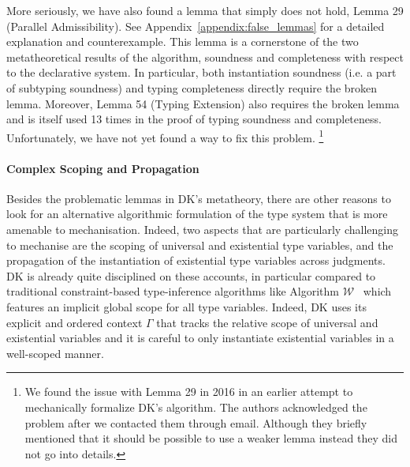 
More seriously, we have also found a lemma that simply does not hold, 
Lemma 29 (Parallel Admissibility). See Appendix~\ref{appendix:false_lemmas}
 for a detailed explanation
and counterexample. This lemma is a cornerstone of the two metatheoretical results 
of the algorithm, soundness and completeness with respect to the declarative system.
In particular, both instantiation soundness (i.e. a part of subtyping
soundness) and typing completeness directly require the broken lemma.
Moreover, Lemma 54 (Typing Extension) also requires the broken lemma and is
itself used 13 times in the proof of typing soundness and completeness.
Unfortunately, we have not yet found a way to fix this problem.
\footnote{We found the issue with Lemma 29 in 2016 in an earlier attempt to mechanically
  formalize DK's algorithm. The authors acknowledged the problem after we contacted them through email.
  Although they briefly mentioned that it should be possible to use a weaker lemma instead they did
  not go into details.
}

\paragraph{Complex Scoping and Propagation}

Besides the problematic lemmas in DK's metatheory, there are other reasons to
look for an alternative algorithmic formulation of the type system that is more
amenable to mechanisation. Indeed, two aspects that are particularly
challenging to mechanise are the scoping of universal and existential type
variables, and the propagation of the instantiation of existential type
variables across judgments. 
DK is already quite disciplined on these accounts, in particular compared to
traditional constraint-based type-inference algorithms like Algorithm $\mathcal{W}$~\cite{milner1978theory} which
features an implicit global scope for all type variables. Indeed, DK uses its
explicit and ordered context $\Gamma$ that tracks the relative scope of universal and
existential variables and it is careful to only instantiate existential
variables in a well-scoped manner.


